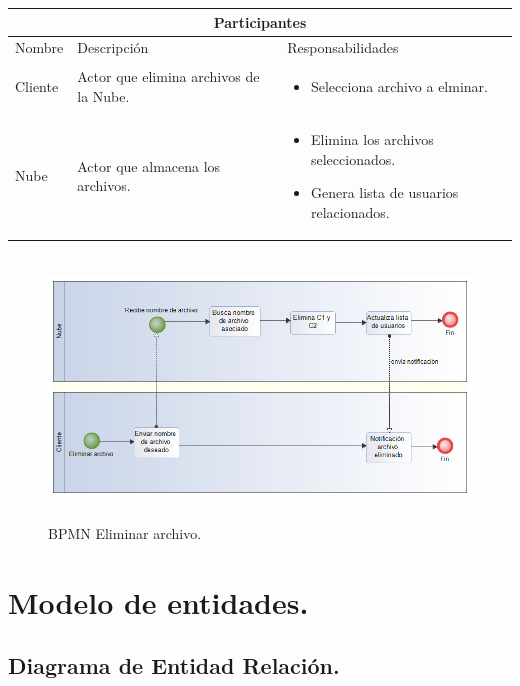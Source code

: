 \begin{tabular}{ |p{2cm}|p{6cm}|p{6cm}|  }
\hline
\multicolumn{3}{|c|}{  Participantes  } \\
\hline

{ Nombre }  & { Descripción } & { Responsabilidades} \\
\hline
{ Cliente } &   Actor que elimina archivos de la Nube.  &  
			\begin{itemize}	
				\item Selecciona archivo a elminar.
			\end{itemize}   \\ 
\hline
{ Nube } &   Actor que almacena los archivos.  &  
			\begin{itemize}	
				\item Elimina los archivos seleccionados.
				\item Genera lista de usuarios relacionados.
			\end{itemize}   \\ 
\hline
\end{tabular}

\begin{figure}[H]
\centering
	\includegraphics[width=16cm, height=7cm]{./images/BPM_Eliminar.png}
	\caption{BPMN Eliminar archivo.}

\end{figure} 

\newpage
\section{Modelo de entidades. }

\subsection{Diagrama de Entidad Relación. }

